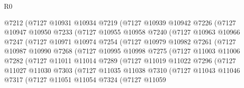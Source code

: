 \begin{lexlean}{R0}
\begin{coremodule}
                @7212
                (@7127
                  @10931
                  @10934
                  @7219
                  (@7127
                    @10939
                    @10942
                    @7226
                    (@7127
                      @10947
                      @10950
                      @7233
                      (@7127
                        @10955
                        @10958
                        @7240
                        (@7127
                          @10963
                          @10966
                          @7247
                          (@7127
                            @10971
                            @10974
                            @7254
                            (@7127
                              @10979
                              @10982
                              @7261
                              (@7127
                                @10987
                                @10990
                                @7268
                                (@7127
                                  @10995
                                  @10998
                                  @7275
                                  (@7127
                                    @11003
                                    @11006
                                    @7282
                                    (@7127
                                      @11011
                                      @11014
                                      @7289
                                      (@7127
                                        @11019
                                        @11022
                                        @7296
                                        (@7127
                                          @11027
                                          @11030
                                          @7303
                                          (@7127
                                            @11035
                                            @11038
                                            @7310
                                            (@7127
                                              @11043
                                              @11046
                                              @7317
                                              (@7127
                                                @11051
                                                @11054
                                                @7324
                                                (@7127
                                                  @11059

\end{coremodule}
\end{lexlean}
